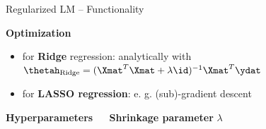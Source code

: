 \documentclass[11pt,compress,t,notes=noshow, xcolor=table]{beamer}
\newcommand{\highlight}[1]{\textcolor{highlightcol}{\textbf{#1}}}
\begin{document}
\begin{frame}{Regularized LM -- Functionality}
\begin{itemize}
  
  
\end{itemize}





\medskip

\highlight{Optimization} ~~
\begin{itemize}\footnotesize
  \item for \textbf{Ridge} regression: analytically with $\thetah_{\text{Ridge}} = (\Xmat^T \Xmat  + \lambda \id)^{-1} \Xmat^T\ydat$
  \item for \textbf{LASSO regression}: e. g. (sub)-gradient descent
\end{itemize}

\medskip

\highlight{Hyperparameters} ~~ \textbf{Shrinkage parameter} $\lambda$%

\medskip


\end{frame}

\end{document}
